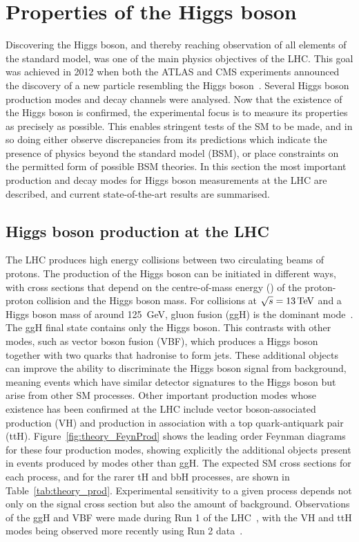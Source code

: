 \section{Properties of the Higgs boson}

Discovering the Higgs boson, and thereby reaching observation of all elements of the standard model, 
was one of the main physics objectives of the LHC. %
This goal was achieved in 2012 when both the ATLAS and CMS experiments 
announced the discovery of a new particle resembling the Higgs boson~\cite{ATLASdiscovery,CMSdiscovery}.
Several Higgs boson production modes and decay channels were analysed.
Now that the existence of the Higgs boson is confirmed, 
the experimental focus is to measure its properties as precisely as possible.
This enables stringent tests of the SM to be made, 
and in so doing either observe discrepancies from its predictions
which indicate the presence of physics beyond the standard model (BSM), 
or place constraints on the permitted form of possible BSM theories.
In this section the most important production and decay modes for Higgs boson measurements
at the LHC are described, and current state-of-the-art results are summarised.

\subsection{Higgs boson production at the LHC}

The LHC produces high energy collisions between two circulating beams of protons.
The production of the Higgs boson can be initiated in different ways, 
with cross sections that depend on the centre-of-mass energy (\sqrtS) of the proton-proton collision
and the Higgs boson mass.
For collisions at $\sqrt{s}=\SI{13}{TeV}$ and a Higgs boson mass of around \SI{125}{GeV}, 
gluon fusion (ggH) is the dominant mode~\cite{YR4}.
The ggH final state contains only the Higgs boson. 
This contrasts with other modes, such as vector boson fusion (VBF), 
which produces a Higgs boson together with two quarks that hadronise to form jets.
These additional objects can improve the ability to discriminate the Higgs boson signal 
from background, meaning events which have similar detector signatures to the Higgs boson
but arise from other SM processes.
Other important production modes whose existence has been confirmed at the LHC include 
vector boson-associated production (VH) 
and production in association with a top quark-antiquark pair (ttH).
Figure~\ref{fig:theory_FeynProd} shows the leading order Feynman diagrams 
for these four production modes, showing explicitly the additional objects present 
in events produced by modes other than ggH.
The expected SM cross sections for each process, and for the rarer tH and bbH processes, 
are shown in Table~\ref{tab:theory_prod}.
Experimental sensitivity to a given process depends not only on the signal cross section 
but also the amount of background.
Observations of the ggH and VBF were made during Run 1 
of the LHC~\cite{ATLAScouplingsRun1,CMScouplingsRun1,ATLASandCMScouplingsRun1}, 
with the VH and ttH modes being observed more recently 
using Run 2 data~\cite{ATLASttHobservation,CMSttHobservation,ATLASbbObservation,CMSbbObservation}.

